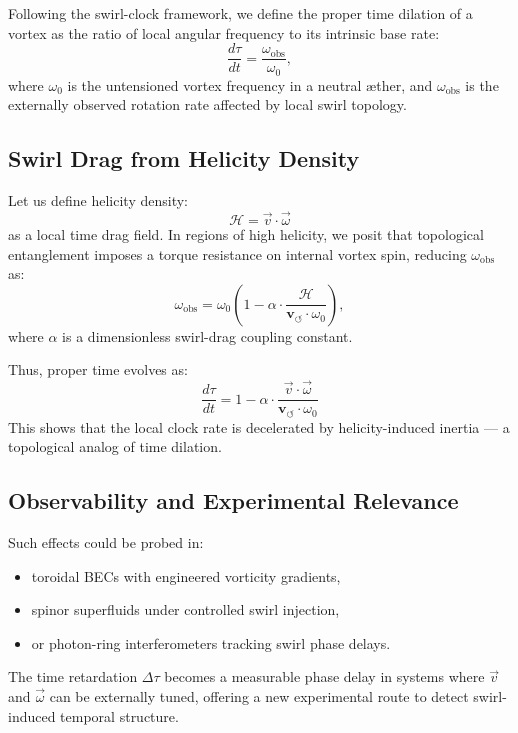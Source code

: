 \documentclass[12pt]{article}
\begin{document}
Following the swirl-clock framework, we define the proper time dilation of a vortex as the ratio of local angular frequency to its intrinsic base rate:
\[
    \frac{d\tau}{dt} = \frac{\omega_{\text{obs}}}{\omega_0},
\]
where \( \omega_0 \) is the untensioned vortex frequency in a neutral æther, and \( \omega_{\text{obs}} \) is the externally observed rotation rate affected by local swirl topology.

\subsection*{Swirl Drag from Helicity Density}

Let us define helicity density:
\[
    \mathcal{H} = \vec{v} \cdot \vec{\omega}
\]
as a local time drag field. In regions of high helicity, we posit that topological entanglement imposes a torque resistance on internal vortex spin, reducing \( \omega_{\text{obs}} \) as:
\[
    \omega_{\text{obs}} = \omega_0 \left( 1 - \alpha \cdot \frac{\mathcal{H}}{\mathbf{v}_{\scriptscriptstyle\boldsymbol{\circlearrowleft}} \cdot \omega_0} \right),
\]
where \( \alpha \) is a dimensionless swirl-drag coupling constant.

Thus, proper time evolves as:
\[
    \boxed{
    \frac{d\tau}{dt} = 1 - \alpha \cdot \frac{\vec{v} \cdot \vec{\omega}}{\mathbf{v}_{\scriptscriptstyle\boldsymbol{\circlearrowleft}} \cdot \omega_0}
    }
\]
This shows that the local clock rate is decelerated by helicity-induced inertia — a topological analog of time dilation.

\subsection*{Observability and Experimental Relevance}

Such effects could be probed in:
\begin{itemize}
  \item toroidal BECs with engineered vorticity gradients,
  \item spinor superfluids under controlled swirl injection,
  \item or photon-ring interferometers tracking swirl phase delays.
\end{itemize}

The time retardation \( \Delta \tau \) becomes a measurable phase delay in systems where \( \vec{v} \) and \( \vec{\omega} \) can be externally tuned, offering a new experimental route to detect swirl-induced temporal structure.
\end{document}
